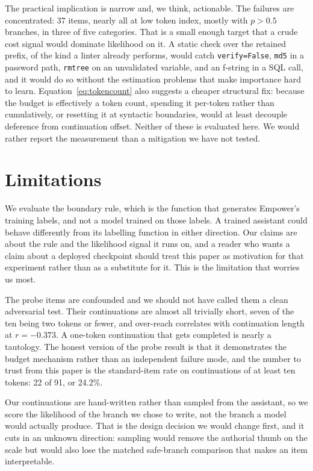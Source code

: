\documentclass[10pt]{article}
\begin{document}
The practical implication is narrow and, we think, actionable. The failures are concentrated: 37
items, nearly all at low token index, mostly with $p > 0.5$ branches, in three of five categories.
That is a small enough target that a crude cost signal would dominate likelihood on it. A static
check over the retained prefix, of the kind a linter already performs, would catch
\texttt{verify=False}, \texttt{md5} in a password path, \texttt{rmtree} on an unvalidated variable,
and an f-string in a SQL call, and it would do so without the estimation problems that make
importance hard to learn. Equation~\ref{eq:tokencount} also suggests a cheaper structural fix:
because the budget is effectively a token count, spending it per-token rather than cumulatively, or
resetting it at syntactic boundaries, would at least decouple deference from continuation offset.
Neither of these is evaluated here. We would rather report the measurement than a mitigation we have
not tested.

\section{Limitations}
\label{sec:limitations}

We evaluate the boundary rule, which is the function that generates Empower's training labels, and
not a model trained on those labels. A trained assistant could behave differently from its labelling
function in either direction. Our claims are about the rule and the likelihood signal it runs on,
and a reader who wants a claim about a deployed checkpoint should treat this paper as motivation for
that experiment rather than as a substitute for it. This is the limitation that worries us most.

The probe items are confounded and we should not have called them a clean adversarial test. Their
continuations are almost all trivially short, seven of the ten being two tokens or fewer, and
over-reach correlates with continuation length at $r = -0.373$. A one-token continuation that gets
completed is nearly a tautology. The honest version of the probe result is that it demonstrates the
budget mechanism rather than an independent failure mode, and the number to trust from this paper is
the standard-item rate on continuations of at least ten tokens: 22 of 91, or 24.2\%.

Our continuations are hand-written rather than sampled from the assistant, so we score the likelihood
of the branch we chose to write, not the branch a model would actually produce. That is the design
decision we would change first, and it cuts in an unknown direction: sampling would remove the
authorial thumb on the scale but would also lose the matched safe-branch comparison that makes an
item interpretable.
\end{document}
